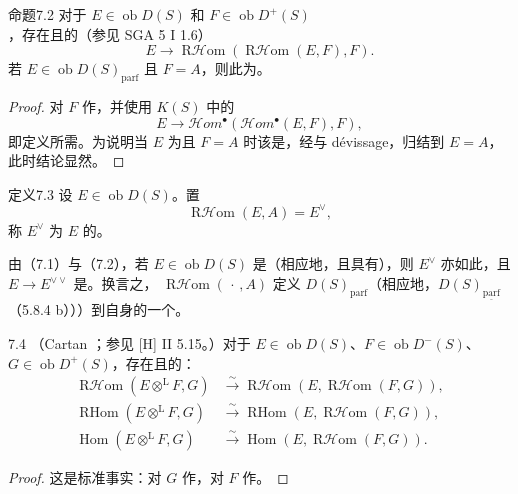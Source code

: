 \begin{SGAresult}{命题}{7.2}
对于 $E\in\operatorname{ob}D(S)$ 和 $F\in\operatorname{ob}D^+(S)$，存在且的（参见 SGA 5 I 1.6）
\[E\longrightarrow\operatorname{R\mathcal Hom}(\operatorname{R\mathcal Hom}(E,F),F).\]
若 $E\in\operatorname{ob}D(S)_{\mathrm{parf}}$ 且 $F=A$，则此为。
\end{SGAresult}
\begin{proof}
对 $F$ 作，并使用 $K(S)$ 中的
\[E\longrightarrow\mathcal Hom^\bullet(\mathcal Hom^\bullet(E,F),F),\]
即定义所需。为说明当 $E$ 为且 $F=A$ 时该是，经与 dévissage，归结到 $E=A$，此时结论显然。
\end{proof}

\begin{SGAresult}{定义}{7.3}
设 $E\in\operatorname{ob}D(S)$。置
\[\operatorname{R\mathcal Hom}(E,A)=E^\vee,\]
称 $E^\vee$ 为 $E$ 的。
\end{SGAresult}
由（7.1）与（7.2），若 $E\in\operatorname{ob}D(S)$ 是（相应地，且具有），则 $E^\vee$ 亦如此，且 $E\to E^{\vee\vee}$ 是。换言之， $\operatorname{R\mathcal Hom}(\,\cdot\,,A)$ 定义 $D(S)_{\mathrm{parf}}$（相应地，$D(S)_{\underline{\mathrm{parf}}}$（5.8.4 b）））到自身的一个。

\begin{SGAresult}{}{7.4}
（Cartan ；参见 [H] II 5.15。）对于 $E\in\operatorname{ob}D(S)$、$F\in\operatorname{ob}D^-(S)$、$G\in\operatorname{ob}D^+(S)$，存在且的：
\[\begin{aligned}
\operatorname{R\mathcal Hom}(E\otimes^{\mathrm L}F,G)&\xrightarrow{\sim}\operatorname{R\mathcal Hom}(E,\operatorname{R\mathcal Hom}(F,G)),\\
\operatorname{RHom}(E\otimes^{\mathrm L}F,G)&\xrightarrow{\sim}\operatorname{RHom}(E,\operatorname{R\mathcal Hom}(F,G)),\\
\operatorname{Hom}(E\otimes^{\mathrm L}F,G)&\xrightarrow{\sim}\operatorname{Hom}(E,\operatorname{R\mathcal Hom}(F,G)).
\end{aligned}\]
\end{SGAresult}
\begin{proof}
这是标准事实：对 $G$ 作，对 $F$ 作。
\end{proof}

